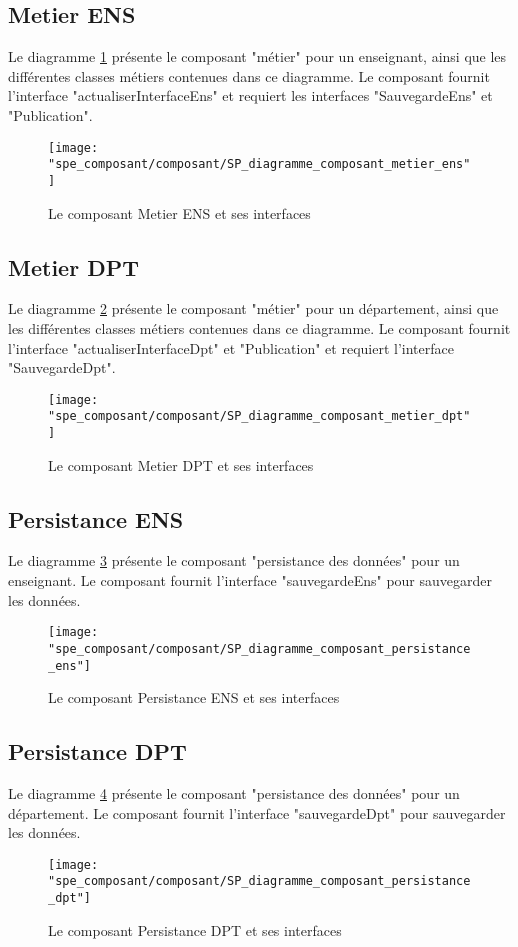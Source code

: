     \subsection{Metier ENS}
        Le diagramme \ref{fig:comp-metier-ens} présente le composant "métier" pour un enseignant, ainsi que les différentes classes métiers contenues dans ce diagramme. Le composant fournit l'interface "actualiserInterfaceEns" et requiert les interfaces "SauvegardeEns" et "Publication".
        \begin{figure}[h]
        	\centering
        	\texttt{[image: "spe\_composant/composant/SP\_diagramme\_composant\_metier\_ens"]}
        	\caption{Le composant Metier ENS et ses interfaces}
        	\label{fig:comp-metier-ens}
        \end{figure}
    \FloatBarrier
    \subsection{Metier DPT}
        Le diagramme \ref{fig:comp-metier-dpt} présente le composant "métier" pour un département, ainsi que les différentes classes métiers contenues dans ce diagramme. Le composant fournit l'interface "actualiserInterfaceDpt" et "Publication" et requiert l'interface "SauvegardeDpt".
        \begin{figure}[h]
        	\centering
        	\texttt{[image: "spe\_composant/composant/SP\_diagramme\_composant\_metier\_dpt"]}
        	\caption{Le composant Metier DPT et ses interfaces}
        	\label{fig:comp-metier-dpt}
        \end{figure}
   \FloatBarrier
    \subsection{Persistance ENS}
        Le diagramme \ref{fig:comp-persist-ens} présente le composant "persistance des données" pour un enseignant. Le composant fournit l'interface "sauvegardeEns" pour sauvegarder les données.
        \begin{figure}[h]
        	\centering
        	\texttt{[image: "spe\_composant/composant/SP\_diagramme\_composant\_persistance\_ens"]}
        	\caption{Le composant Persistance ENS et ses interfaces}
        	\label{fig:comp-persist-ens}
        \end{figure}
    \FloatBarrier
    \subsection{Persistance DPT}
        Le diagramme \ref{fig:comp-persist-dpt} présente le composant "persistance des données" pour un département. Le composant fournit l'interface "sauvegardeDpt" pour sauvegarder les données.
        \begin{figure}[h]
        	\centering
        	\texttt{[image: "spe\_composant/composant/SP\_diagramme\_composant\_persistance\_dpt"]}
        	\caption{Le composant Persistance DPT et ses interfaces}
        	\label{fig:comp-persist-dpt}
        \end{figure}

